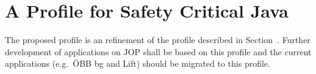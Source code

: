 
\section{A Profile for Safety Critical Java}
\label{sec:scjava}

The proposed profile is an refinement of the profile described in
Section~\label{sec:rtprof}. Further development of applications on
JOP shall be based on this profile and the current applications
(e.g.\ \"OBB bg and Lift) should be migrated to this profile.
